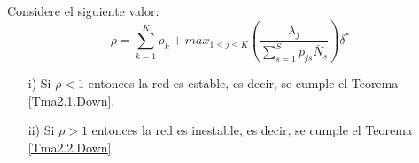 \begin{Teo}\label{Tma2.3.Down}
Considere el siguiente valor:
\begin{equation}\label{Eq.Rho.1serv}
\rho=\sum_{k=1}^{K}\rho_{k}+max_{1\leq j\leq K}\left(\frac{\lambda_{j}}{\sum_{s=1}^{S}p_{js}\overline{N}_{s}}\right)\delta^{*}
\end{equation}
\begin{itemize}
\item[i)] Si $\rho<1$ entonces la red es estable, es decir, se
cumple el Teorema \ref{Tma2.1.Down}.

\item[ii)] Si $\rho>1$ entonces la red es inestable, es decir, se
cumple el Teorema \ref{Tma2.2.Down}
\end{itemize}
\end{Teo}


